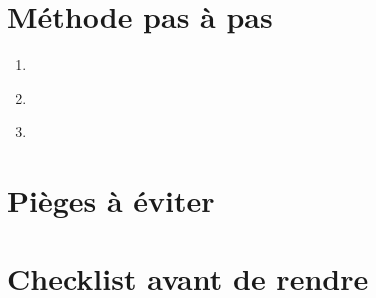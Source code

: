 \documentclass[a4paper,11pt]{article}
\begin{document}
\section*{Méthode pas à pas}
\begin{enumerate}[nosep]
  \item ~
  \item ~
  \item ~
\end{enumerate}
\section*{Pièges à éviter}
\section*{Checklist avant de rendre}
\end{document}
